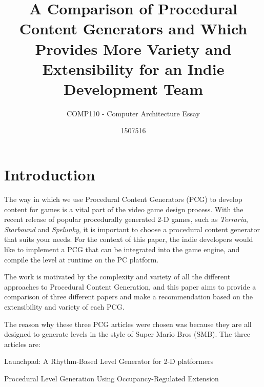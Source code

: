 \documentclass{scrartcl}
\title{A Comparison of Procedural Content Generators and Which Provides More Variety and Extensibility for an Indie Development Team}
\subtitle{COMP110 - Computer Architecture Essay}
\author{1507516}
\begin{document}
\maketitle




\section{Introduction}

The way in which we use Procedural Content Generators (PCG) to develop content for games is a vital part of the video game design process. With the recent release of popular procedurally generated 2-D games, such as \textit{Terraria}, \textit{Starbound} and \textit{Spelunky}, it is important to choose a procedural content generator that suits your needs. For the context of this paper, the indie developers would like to implement a PCG that can be integrated into the game engine, and compile the level at runtime on the PC platform.

The work is motivated by the complexity and variety of all the different approaches to Procedural Content Generation, and this paper aims to provide a comparison of three different papers and make a recommendation based on the extensibility and variety of each PCG. 

The reason why these three PCG articles were chosen was because they are all designed to generate levels in the style of Super Mario Bros (SMB).
The three articles are:

Launchpad: A Rhythm-Based Level Generator for 2-D platformers \cite{smith2009} \par

Procedural Level Generation Using Occupancy-Regulated Extension \cite{mawhorter2010} \par
\end{document}
